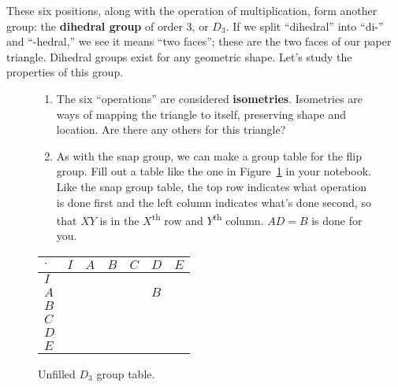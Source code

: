 \documentclass[../gatm.tex]{subfiles}
\begin{document}
These six positions, along with the operation of multiplication, form another group: the \textbf{dihedral group} of order $3$, or $D_3$. If we split ``dihedral'' into ``di-'' and ``-hedral,'' we see it means ``two faces''; these are the two faces of our paper triangle. Dihedral groups exist for any geometric shape. Let's study the properties of this group.


\begin{figure}[H]
\begin{minipage}{0.6\textwidth}
\begin{enumerate}
\item The six ``operations'' are considered \textbf{isometries}. Isometries are ways of mapping the triangle to itself, preserving shape and location. Are there any others for this triangle?
\item As with the snap group, we can make a group table for the flip group. Fill out a table like the one in Figure~\ref{fig:sbstable} in your notebook. Like the snap group table, the top row indicates what operation is done first and the left column indicates what's done second, so that $XY$ is in the $X$\textsuperscript{th} row and $Y$\textsuperscript{th} column. $AD=B$ is done for you.
\setcounter{enumLast}{\theenumi}
\end{enumerate}
\end{minipage}\hfill%
\begin{minipage}{0.35\textwidth}\centering
\begin{tabular}{C|C|C|C|C|C|C|}
$\cdot$ & $I$ & $A$ & $B$ & $C$ & $D$ & $E$ \\ \hline
$I$    &   &   &   &   &   &   \\ \hline
$A$    &   &   &   &   & $B$  &   \\ \hline
$B$    &   &   &   &   &   &   \\ \hline
$C$    &   &   &   &   &   &   \\ \hline
$D$    &   &   &   &   &   &   \\ \hline
$E$    &   &   &   &   &   &   \\ \hline
\end{tabular}
\caption{Unfilled $D_3$ group table.}
\label{fig:sbstable}
\end{minipage}
\end{figure}
\end{document}
